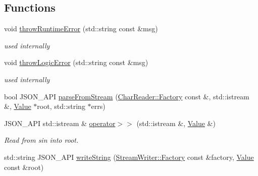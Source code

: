\subsection*{Functions}
\begin{DoxyCompactItemize}
\item 
void \hyperlink{namespace_json_a97f039a107b3f6cf1c3edee50e978f76}{throw\+Runtime\+Error} (std\+::string const \&msg)\hypertarget{namespace_json_a97f039a107b3f6cf1c3edee50e978f76}{}\label{namespace_json_a97f039a107b3f6cf1c3edee50e978f76}

\begin{DoxyCompactList}\small\item\em used internally \end{DoxyCompactList}\item 
void \hyperlink{namespace_json_a27613326e9e36bbfe04a905ac90caa91}{throw\+Logic\+Error} (std\+::string const \&msg)\hypertarget{namespace_json_a27613326e9e36bbfe04a905ac90caa91}{}\label{namespace_json_a27613326e9e36bbfe04a905ac90caa91}

\begin{DoxyCompactList}\small\item\em used internally \end{DoxyCompactList}\item 
bool J\+S\+O\+N\+\_\+\+A\+PI \hyperlink{namespace_json_acfebeaf759a841173ddce34c4da22486}{parse\+From\+Stream} (\hyperlink{class_json_1_1_char_reader_1_1_factory}{Char\+Reader\+::\+Factory} const \&, std\+::istream \&, \hyperlink{class_json_1_1_value}{Value} $\ast$root, std\+::string $\ast$errs)
\item 
J\+S\+O\+N\+\_\+\+A\+PI std\+::istream \& \hyperlink{namespace_json_a4d245ef719cc0853e8e78eb5f99c16e5}{operator$>$$>$} (std\+::istream \&, \hyperlink{class_json_1_1_value}{Value} \&)
\begin{DoxyCompactList}\small\item\em Read from \textquotesingle{}sin\textquotesingle{} into \textquotesingle{}root\textquotesingle{}. \end{DoxyCompactList}\item 
std\+::string J\+S\+O\+N\+\_\+\+A\+PI \hyperlink{namespace_json_afd767fe4c7e962d0ff3d1a6d1622619f}{write\+String} (\hyperlink{class_json_1_1_stream_writer_1_1_factory}{Stream\+Writer\+::\+Factory} const \&factory, \hyperlink{class_json_1_1_value}{Value} const \&root)\hypertarget{namespace_json_afd767fe4c7e962d0ff3d1a6d1622619f}{}\label{namespace_json_afd767fe4c7e962d0ff3d1a6d1622619f}


\end{DoxyCompactItemize}
